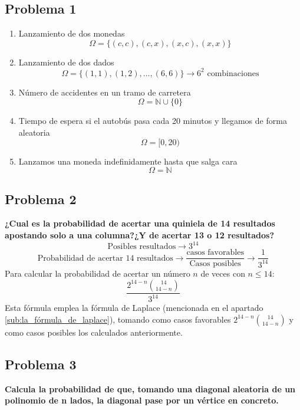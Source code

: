 \documentclass[11pt]{article}
\newcommand{\N}{\mathbb{N}}
\newcommand{\OMG}{\varOmega}
\theoremstyle{plain}
\begin{document}
        \subsection{Problema 1} %
        \label{sub:problema_1}
            \begin{enumerate}[label=\Alph*]
                \item Lanzamiento de dos monedas \[\OMG = \{(c,c),(c,x),(x,c),(x,x)\}\]
                \item Lanzamiento de dos dados \[\OMG = \{(1,1),(1,2),...,(6,6)\} \rightarrow 6^2 \text{ combinaciones}\]
                \item Número de accidentes en un tramo de carretera \[\OMG = \N \cup \{0\}\]
                \item Tiempo de espera si el autobús pasa cada 20 minutos y llegamos de forma aleatoria \[\OMG = [0,20)\]
                \item Lanzamos una moneda indefinidamente hasta que salga cara \[\OMG = \N\] 
            \end{enumerate}        
        \subsection{Problema 2} %
        \label{sub:problema_2}
            \textbf{¿Cual es la probabilidad de acertar una quiniela de 14 resultados apostando solo a una columna?¿Y de acertar 13 o 12 resultados?}
            \[\text{Posibles resultados}\rightarrow3^{14}\]
            \[\text{Probabilidad de acertar 14 resultados} \rightarrow \frac{\text{casos favorables}}{\text{Casos posibles}} \rightarrow \frac{1}{3^{14}}\]
            Para calcular la probabilidad de acertar un número $n$ de veces con $n\le14$:
            \begin{equation}
                \frac{2^{14-n} \binom{14}{14-n}}{3^{14}}
            \end{equation}
            Esta fórmula emplea la fórmula de Laplace (mencionada en el apartado \ref{sub:la_fórmula_de_laplace}), tomando como casos favorables $2^{14-n} \binom{14}{14-n}$ y como casos posibles los calculados anteriormente.
        \subsection{Problema 3} %
        \label{sub:problema_3}
            \textbf{Calcula la probabilidad de que, tomando una diagonal aleatoria de un polinomio de n lados, la diagonal pase por un vértice en concreto.}\\
\end{document}

